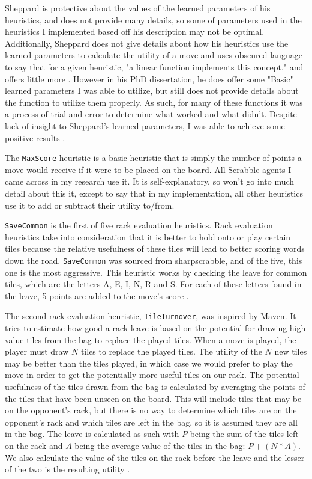 \documentclass[letterpaper]{article}
\begin{document}
Sheppard is protective about the values of the learned parameters of his heuristics, and does not provide many details, so some of parameters used in the heuristics I implemented based off his description may not be optimal. Additionally, Sheppard does not give details about how his heuristics use the learned parameters to calculate the utility of a move and uses obscured language to say that for a given heuristic, "a linear function implements this concept," and offers little more \cite{1sheppard2002}. However in his PhD dissertation, he does offer some "Basic" learned parameters I was able to utilize, but still does not provide details about the function to utilize them properly. As such, for many of these functions it was a process of trial and error to determine what worked and what didn't. Despite lack of insight to Sheppard's learned parameters, I was able to achieve some positive results \cite{2sheppard2002}.

The \texttt{MaxScore} heuristic is a basic heuristic that is simply the number of points a move would receive if it were to be placed on the board. All Scrabble agents I came across in my research use it. It is self-explanatory, so won't go into much detail about this it, except to say that in my implementation, all other heuristics use it to add or subtract their utility to/from.

\texttt{SaveCommon} is the first of five rack evaluation heuristics. Rack evaluation heuristics take into consideration that it is better to hold onto or play certain tiles because the relative usefulness of these tiles will lead to better scoring words down the road. \texttt{SaveCommon} was sourced from sharpscrabble, and of the five, this one is the most aggressive. This heuristic works by checking the leave for common tiles, which are the letters A, E, I, N, R and S. For each of these letters found in the leave, 5 points are added to the move's score \cite{sharpscrabble}.

The second rack evaluation heuristic, \texttt{TileTurnover}, was inspired by Maven. It tries to estimate how good a rack leave is based on the potential for drawing high value tiles from the bag to replace the played tiles. When a move is played, the player must draw $N$ tiles to replace the played tiles. The utility of the $N$ new tiles may be better than the tiles played, in which case we would prefer to play the move in order to get the potentially more useful tiles on our rack. The potential usefulness of the tiles drawn from the bag is calculated by averaging the points of the tiles that have been unseen on the board. This will include tiles that may be on the opponent's rack, but there is no way to determine which tiles are on the opponent's rack and which tiles are left in the bag, so it is assumed they are all in the bag. The leave is calculated as such with $P$ being the sum of the tiles left on the rack and $A$ being the average value of the tiles in the bag: $P + (N * A)$. We also calculate the value of the tiles on the rack before the leave and the lesser of the two is the resulting utility \cite{1sheppard2002}.
\end{document}
